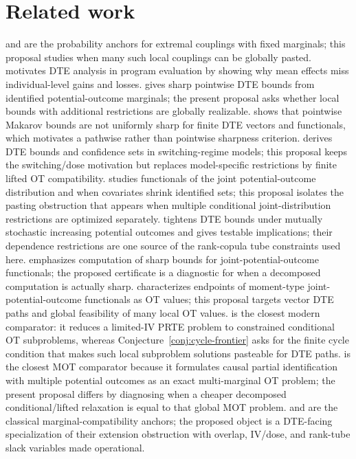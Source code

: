 \documentclass[11pt]{article}
\theoremstyle{definition}
\theoremstyle{plain}
\theoremstyle{remark}
\begin{document}
\section{Related work}
\citet{Makarov1981} and \citet{Rueschendorf1982} are the probability anchors for
extremal couplings with fixed marginals; this proposal studies when many such
local couplings can be globally pasted.  \citet{HeckmanSmithClements1997}
motivates DTE analysis in program evaluation by showing why mean effects miss
individual-level gains and losses.  \citet[Section 2 and Lemma 2.3]{FanPark2010}
gives sharp pointwise DTE bounds from identified potential-outcome marginals; the
present proposal asks whether local bounds with additional restrictions are
globally realizable.  \citet[Section 2]{FirpoRidder2019} shows that pointwise
Makarov bounds are not uniformly sharp for finite DTE vectors and functionals,
which motivates a pathwise rather than pointwise sharpness criterion.
\citet[Sections 2--3]{FanWu2010} derives DTE bounds and confidence sets in
switching-regime models; this proposal keeps the switching/dose motivation but
replaces model-specific restrictions by finite lifted OT compatibility.
\citet[Sections 2--3]{FanGuerreZhu2017} studies functionals of the joint
potential-outcome distribution and when covariates shrink identified sets; this
proposal isolates the pasting obstruction that appears when multiple conditional
joint-distribution restrictions are optimized separately.  \citet{FrandsenLefgren2021}
tightens DTE bounds under mutually stochastic increasing potential outcomes and
gives testable implications; their dependence restrictions are one source of the
rank-copula tube constraints used here.  \citet[Supplementary Appendix 3]{Russell2021}
emphasizes computation of sharp bounds for joint-potential-outcome functionals;
the proposed certificate is a diagnostic for when a decomposed computation is
actually sharp.  \citet[Sections 2--3]{OberReynolds2023} characterizes endpoints
of moment-type joint-potential-outcome functionals as OT values; this proposal
targets vector DTE paths and global feasibility of many local OT values.
\citet[Sections 2--3]{TanBlanchetSyrgkanis2026} is the closest modern comparator:
it reduces a limited-IV PRTE problem to constrained conditional OT subproblems,
whereas Conjecture~\ref{conj:cycle-frontier} asks for the finite cycle condition
that makes such local subproblem solutions pasteable for DTE paths.
\citet[Section 2]{GaoGeQian2025} is the closest MOT comparator because it
formulates causal partial identification with multiple potential outcomes as an
exact multi-marginal OT problem; the present proposal differs by diagnosing when
a cheaper decomposed conditional/lifted relaxation is equal to that global MOT
problem.  \citet[Section 2]{Vorobev1962} and \citet[Chapter 3]{Kellerer1984}
are the classical marginal-compatibility anchors; the proposed object is a
DTE-facing specialization of their extension obstruction with overlap, IV/dose,
and rank-tube slack variables made operational.
\end{document}
